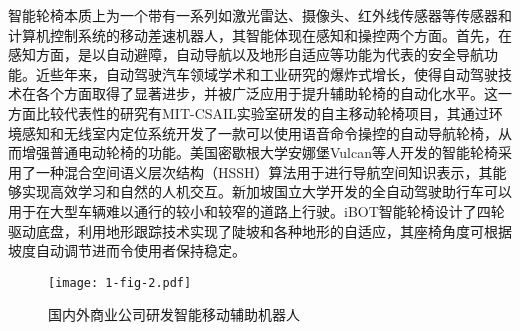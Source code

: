 智能轮椅本质上为一个带有一系列如激光雷达、摄像头、红外线传感器等传感器和计算机控制系统的移动差速机器人，其智能体现在感知和操控两个方面\cite{kimLiteratureReviewSmart2023}。首先，在感知方面，是以自动避障，自动导航以及地形自适应等功能为代表的安全导航功能。近些年来，自动驾驶汽车领域学术和工业研究的爆炸式增长，使得自动驾驶技术在各个方面取得了显著进步，并被广泛应用于提升辅助轮椅的自动化水平。这一方面比较代表性的研究有MIT-CSAIL实验室研发的自主移动轮椅项目\cite{walterFrameworkLearningSemantic2014}，其通过环境感知和无线室内定位系统开发了一款可以使用语音命令操控的自动导航轮椅，从而增强普通电动轮椅的功能。美国密歇根大学安娜堡Vulcan等人\cite{fosterReflectanceFieldMap2023,parkDiscretetimeDynamicModeling2017}开发的智能轮椅采用了一种混合空间语义层次结构（HSSH）算法用于进行导航空间知识表示，其能够实现高效学习和自然的人机交互。新加坡国立大学开发的全自动驾驶助行车\cite{SelfdrivingScooterUnveiled}可以用于在大型车辆难以通行的较小和较窄的道路上行驶。iBOT智能轮椅设计了四轮驱动底盘\cite{MobiusMobilityNext}，利用地形跟踪技术实现了陡坡和各种地形的自适应，其座椅角度可根据坡度自动调节进而令使用者保持稳定。
\begin{figure}[h]
  \centering
  \texttt{[image: 1-fig-2.pdf]}
  \caption{国内外商业公司研发智能移动辅助机器人}
  \label{fig:1-2}
\end{figure}

